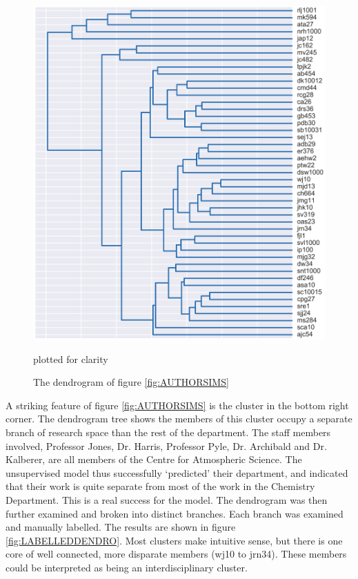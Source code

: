 \begin{center}
\begin{figure}[H]
\label{fig:DENDRO}
  \centering
    \includegraphics[width=\textwidth]{Analysis/dendro.png}
    \caption{The dendrogram of figure \ref{fig:AUTHORSIMS}} plotted for clarity
\end{figure} 
\end{center}
A striking feature of figure \ref{fig:AUTHORSIMS} is the cluster in the bottom right corner. The dendrogram tree shows the members of this cluster occupy a separate branch of research space than the rest of the department. The staff members involved, Professor Jones, Dr. Harris, Professor Pyle, Dr. Archibald and Dr. Kalberer, are all members of the Centre for Atmospheric Science. The unsupervised model thus successfully `predicted' their department, and indicated that their work is quite separate from most of the work in the Chemistry Department. This is a real success for the model. The dendrogram was then further examined and broken into distinct branches. Each branch was examined and manually labelled. The results are shown in figure \ref{fig:LABELLEDDENDRO}. Most clusters make intuitive sense, but there is one core of well connected, more disparate members (wj10 to jrn34). These members could be interpreted as being an interdisciplinary cluster.  
